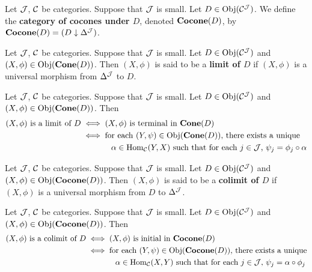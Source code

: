 \documentclass{book}
\begin{document}
	\begin{defn}
		Let $\mathcal{J}$, $\mathcal{C}$ be categories. Suppose that $\mathcal{J}$ is small. Let $D \in \operatorname{Obj}(\mathcal{C}^{\mathcal{J}})$. We define the \textbf{category of cocones under $D$}, denoted $\operatorname*{\text{\textbf{Cocone}}}(D)$, by $\operatorname*{\text{\textbf{Cocone}}}(D) = (D \downarrow \Delta^{\mathcal{J}})$.
	\end{defn}

	\begin{defn}
		Let $\mathcal{J}$, $\mathcal{C}$ be categories. Suppose that $\mathcal{J}$ is small. Let $D \in \operatorname{Obj}(\mathcal{C}^{\mathcal{J}})$ and $(X, \phi) \in \operatorname{Obj}(\operatorname*{\text{\textbf{Cone}}}(D))$. Then $(X, \phi)$ is said to be a \textbf{limit of $D$} if $(X, \phi)$ is a universal morphism from $\Delta^{\mathcal{J}}$ to $D$.  
	\end{defn}



	\begin{note}
		Let $\mathcal{J}$, $\mathcal{C}$ be categories. Suppose that $\mathcal{J}$ is small. Let $D \in \operatorname{Obj}(\mathcal{C}^{\mathcal{J}})$ and $(X, \phi) \in \operatorname{Obj}(\operatorname*{\text{\textbf{Cone}}}(D))$. Then 
		\begin{align*}
			\text{$(X, \phi)$  is a limit of $D$} 
			& \iff \text{$(X, \phi)$ is terminal in $\operatorname*{\text{\textbf{Cone}}}(D)$} \\
			& \iff \text{for each $(Y, \psi) \in \operatorname{Obj}(\operatorname*{\text{\textbf{Cone}}}(D))$, there exists a unique} \\
			& \hspace{1.3cm }\text{$\alpha \in \operatorname{Hom}_{\mathcal{C}}(Y, X)$ such that for each $j \in \mathcal{J}$, $\psi_j = \phi_j \circ \alpha$}
		\end{align*} 
	\end{note} 


	\begin{defn}
		Let $\mathcal{J}$, $\mathcal{C}$ be categories. Suppose that $\mathcal{J}$ is small. Let $D \in \operatorname{Obj}(\mathcal{C}^{\mathcal{J}})$ and $(X, \phi) \in \operatorname{Obj}(\operatorname*{\text{\textbf{Cocone}}}(D))$. Then $(X, \phi)$ is said to be a \textbf{colimit of $D$} if $(X, \phi)$ is a universal morphism from $D$ to $\Delta^{\mathcal{J}}$.  
	\end{defn}

	\begin{note}
		Let $\mathcal{J}$, $\mathcal{C}$ be categories. Suppose that $\mathcal{J}$ is small. Let $D \in \operatorname{Obj}(\mathcal{C}^{\mathcal{J}})$ and $(X, \phi) \in \operatorname{Obj}(\operatorname*{\text{\textbf{Cocone}}}(D))$. Then 
		\begin{align*}
			\text{$(X, \phi)$  is a colimit of $D$} 
			& \iff \text{$(X, \phi)$ is initial in $\operatorname*{\text{\textbf{Cocone}}}(D)$} \\
			& \iff \text{for each $(Y, \psi) \in \operatorname{Obj}(\operatorname*{\text{\textbf{Cocone}}}(D))$, there exists a unique} \\
			& \hspace{1.3cm }\text{$\alpha \in \operatorname{Hom}_{\mathcal{C}}(X, Y)$ such that for each $j \in \mathcal{J}$, $\psi_j = \alpha \circ \phi_j $}
		\end{align*} 
	\end{note} 
\end{document}
